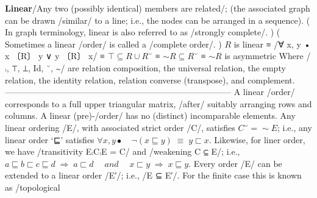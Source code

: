 \documentclass[11pt]{article}
\begin{document}
\vspace{1em}\textbf{Linear}\quad\label{org-special-block-extras-glossary-Linear}/Any two (possibly identical) members are related/; (the associated graph can be drawn /similar/ to a line; i.e., the nodes can be arranged in a sequence).  ( In graph terminology, linear is also referred to as /strongly complete/. )  ( Sometimes a linear /order/ is called a /complete order/. )   \quad  $R$ is linear ≡ \quad /∀ x, y • x 〔R〕 y \quad ∨ \quad y 〔R〕 x/ ≡ \quad $⊤ ⊆ R ∪ R ˘$ ≡ \quad $∼ R ⊆ R ˘$ ≡ \quad $∼ R$ is asymmetric  Where /⨾, ⊤, ⊥, Id, ˘, ∼/ are relation composition, the universal relation, the empty relation, the identity relation, relation converse (transpose), and complement. -------------------------------------------------------------------------------- A linear /order/ corresponds to a full upper triangular matrix, /after/ suitably arranging rows and columns. A linear (pre)-/order/ has no (distinct) incomparable elements.  Any linear ordering /E/, with associated strict order /C/, satisfies $C˘ = ∼E$; i.e., any linear order ‘⊑’ satisfies $∀ x, y •\quad ¬ (x ⊑ y) \;≡\; y ⊏ x$.  Likewise, for liner order, we have /transitivity E⨾C⨾E = C/ and /weakening C ⊆ E/; i.e., $a ⊑ b ⊏ c ⊑ d \;⇒\; a ⊏ d \quad\; and\; \quad x ⊏ y \;⇒\; x ⊑ y$.  Every order /E/ can be extended to a linear order /E′/; i.e., /E ⊆ E′/. \quad For the finite case this is known as /topological 
\end{document}
